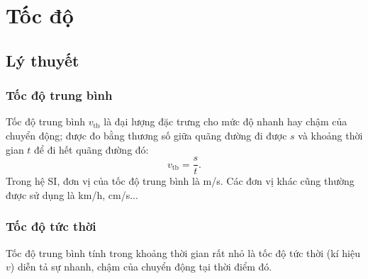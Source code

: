 \let\lesson\undefined
\newcommand{\lesson}{\phantomlesson{Bài 4: Chuyển động thẳng}}
\chapter[Tốc độ]{Tốc độ}
\setcounter{section}{0}
\section{Lý thuyết}
\subsection{Tốc độ trung bình}
Tốc độ trung bình $v_{\text{tb}}$ là đại lượng đặc trưng cho mức độ nhanh hay chậm của chuyển động; được đo bằng thương số giữa quãng đường đi được $s$ và khoảng thời gian $t$ để đi hết quãng đường đó:
\begin{equation}
	v_{\text{tb}}=\dfrac{s}{t}.
\end{equation}
Trong hệ SI, đơn vị của tốc độ trung bình là m/s. Các đơn vị khác cũng thường được sử dụng là km/h, cm/s...
\subsection{Tốc độ tức thời}
Tốc độ trung bình tính trong khoảng thời gian rất nhỏ là tốc độ tức thời (kí hiệu $v$) diễn tả sự nhanh, chậm của chuyển động tại thời điểm đó.

